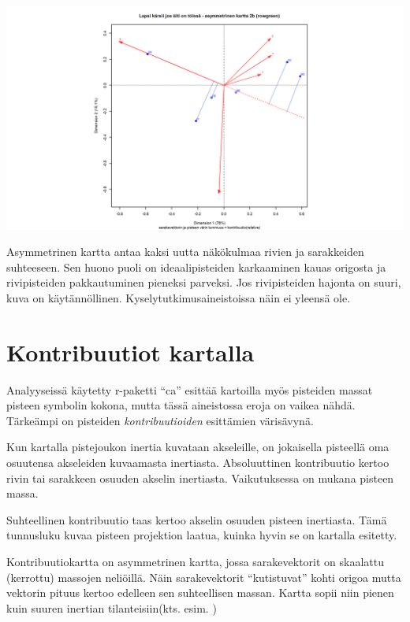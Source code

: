 \documentclass[
  finnish,
]{book}
\begin{document}
\begin{center}\includegraphics[width=0.9\linewidth]{img/simpleCAasymmTulk2} \end{center}

Asymmetrinen kartta antaa kaksi uutta näkökulmaa rivien ja sarakkeiden suhteeseen.
Sen huono puoli on ideaalipisteiden karkaaminen kauas origosta ja rivipisteiden
pakkautuminen pieneksi parveksi. Jos rivipisteiden hajonta on suuri,
kuva on käytännöllinen. Kyselytutkimusaineistoissa näin ei yleensä ole.

\hypertarget{kontribuutiot-kartalla}{%
\section{Kontribuutiot kartalla}\label{kontribuutiot-kartalla}}

Analyyseissä käytetty r-paketti ``ca'' esittää kartoilla myös pisteiden massat pisteen
symbolin kokona, mutta tässä aineistossa eroja on vaikea nähdä. Tärkeämpi on pisteiden
\emph{kontribuutioiden} esittämien värisävynä.

Kun kartalla pistejoukon inertia kuvataan akseleille, on jokaisella pisteellä oma
osuutensa akseleiden kuvaamasta inertiasta. Absoluuttinen kontribuutio kertoo rivin
tai sarakkeen osuuden akselin inertiasta. Vaikutuksessa on mukana pisteen massa.

Suhteellinen kontribuutio taas kertoo akselin osuuden pisteen inertiasta.
Tämä tunnusluku kuvaa pisteen projektion laatua, kuinka hyvin se on kartalla esitetty.

Kontribuutiokartta on asymmetrinen kartta, jossa sarakevektorit on skaalattu
(kerrottu) massojen neliöillä. Näin sarakevektorit ``kutistuvat'' kohti origoa mutta
vektorin pituus kertoo edelleen sen suhteellisen massan. Kartta sopii niin pienen
kuin suuren inertian tilanteisiin(kts. esim. \citep{RefWorks:doc:5c768b09e4b02df9431e950a})
\end{document}
